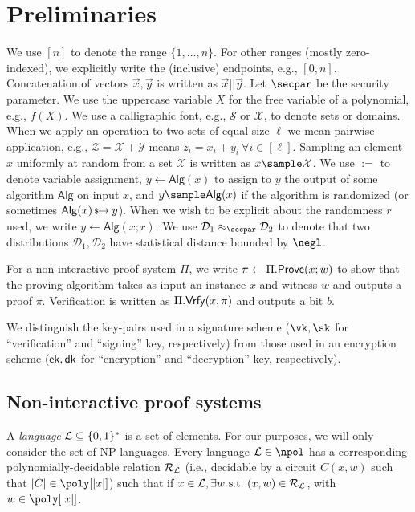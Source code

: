 \section{Preliminaries}\label{sec:prelims}

We use $[n]$ to denote the range $\{1, \dots, n\}$. For other ranges (mostly zero-indexed), we explicitly write the (inclusive) endpoints, e.g., $[0,n]$. 
Concatenation of vectors $\vec{x},\vec{y}$ is written as $\vec{x} || \vec{y}$. 
Let $\secpar$ be the security parameter.
We use the uppercase variable $X$ for the free variable of a polynomial, e.g., $f(X)$. 
We use a calligraphic font, e.g., $\mathcal{S}$ or $\mathcal{X}$, to denote sets or domains. When we apply an operation to two sets of equal size $\ell$ we mean pairwise application, e.g., $\mathcal{Z} = \mathcal{X} + \mathcal{Y}$ means $z_i = x_i + y_i~\forall{i \in [\ell]}$. 
Sampling an element $x$ uniformly at random from a set $\mathcal{X}$ is written as $x \sample \mathcal{X}$. 
We use $:=$ to denote variable assignment, $y \gets \mathsf{Alg}(x)$ to assign to $y$ the output of some algorithm $\mathsf{Alg}$ on input $x$, and $y \sample \mathsf{Alg}(x)$ if the algorithm is randomized (or sometimes $\mathsf{Alg}(x) \,{\mbox{\scriptsize${\$}$\normalsize}\!\!\to}\hskip2.3pt y$). When we wish to be explicit about the randomness $r$ used, we write $y \gets \mathsf{Alg}(x; r)$. We use $\mathcal{D}_1 \approx_\secpar \mathcal{D}_2$ to denote that two distributions $\mathcal{D}_1, \mathcal{D}_2$ have statistical distance bounded by $\negl$.

For a non-interactive proof system $\Pi$, we write $\pi \gets \Pi.\mathsf{Prove}(x; w)$ to show that the proving algorithm takes as input an instance $x$ and witness $w$ and outputs a proof $\pi$. Verification is written as $\Pi.\mathsf{Vrfy}(x, \pi)$ and outputs a bit $b$. 

We distinguish the key-pairs used in a signature scheme ($\vk, \sk$ for ``verification'' and ``signing'' key, respectively) from those used in an encryption scheme ($\mathsf{ek}, \mathsf{dk}$ for ``encryption'' and ``decryption'' key, respectively). 

\subsection{Non-interactive proof systems}\label{sec:nizks}

A \emph{language} $\mathcal{L} \subseteq \{0,1\}^*$ is a set of elements. For our purposes, we will only consider the set of NP languages. Every language $\Lang \in \npol$ has a corresponding polynomially-decidable relation $\mathcal{R}_{\mathcal{L}}$ (i.e., decidable by a circuit $C(x,w)$ such that $\sizeof{C} \in \poly[\sizeof{x}]$) such that if $x \in \mathcal{L}, \exists w \mathrm{~s.t.~} (x,w) \in \mathcal{R}_{\mathcal{L}}$, with $w \in \poly[\sizeof{x}]$.

